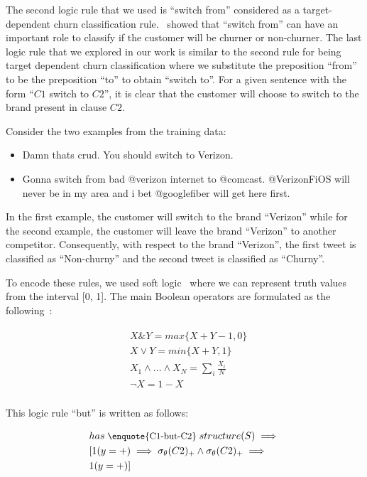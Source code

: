 \documentclass[11pt,letterpaper]{article}
\begin{document}
The second logic rule that we used is \enquote{switch from} considered as a target-dependent churn classification rule.~\cite{amiri2016} showed that \enquote{switch from} can have an important role to classify if the customer will be churner or non-churner. The last logic rule that we explored in our work is similar to the second rule for being target dependent churn classification where we substitute the preposition \enquote{from} to be the preposition \enquote{to} to obtain \enquote{switch to}. For a given sentence with the form \enquote{\(C1\) switch to \(C2\)}, it is clear that the customer will choose to switch to the brand present in clause \(C2\).

Consider the two examples from the training data: 
\begin{itemize}
\item Damn thats crud. You should switch to Verizon.
\item Gonna switch from bad @verizon internet to @comcast. @VerizonFiOS will never be in my area and i bet @googlefiber will get here first. 
\end{itemize}

In the first example, the customer will switch to the brand \enquote{Verizon} while for the second example, the customer will leave the brand \enquote{Verizon} to another competitor. Consequently, with respect to the brand \enquote{Verizon}, the first tweet is classified as \enquote{Non-churny} and the second tweet is classified as \enquote{Churny}.

To encode these rules, we used soft logic~\cite{bach} where we can represent truth values from the interval [0, 1]. The main Boolean operators are formulated as the following~\cite{foulds}:

\begin{equation}
\begin{split}
\begin{aligned}
&X \& Y = max \{X + Y - 1, 0\} \\
& X \vee Y = min \{X + Y, 1\} \\
& X_1 \wedge ...\wedge X_N = \sum_i \frac{X_i}{N} \\
& \neg X = 1 - X \\
\end{aligned}
\end{split}
\end{equation}

This logic rule \enquote{but} is written as follows:

\begin{equation}
\begin{split}
\begin{aligned}
&{\small has \; \text{\enquote{C1-but-C2}} \; structure(S) \implies } \\
&[1(y=+) \implies \sigma_\theta (C2)_+ \wedge \sigma_\theta (C2)_+ \implies \\
& 1(y=+)] \\
\end{aligned}
\end{split}
\end{equation}
\end{document}
